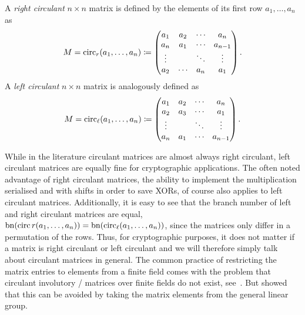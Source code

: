 \begin{definition}
    A \emph{right circulant} $n \times n$ matrix is defined by the elements of its first row $a_1, \ldots, a_n$ as
    \begin{equation*}
        M = \operatorname{circ}_r(a_1, \ldots, a_n) \coloneqq \begin{pmatrix}
            a_1    & a_2    & \cdots & a_n     \\
            a_n    & a_1    & \cdots & a_{n-1} \\
            \vdots &        & \ddots & \vdots  \\
            a_2    & \cdots & a_n    & a_1     \\
        \end{pmatrix}.
    \end{equation*}
    A \emph{left circulant} $n \times n$ matrix is analogously defined as
    \begin{equation*}
        M = \operatorname{circ}_{\ell}(a_1, \ldots, a_n) \coloneqq \begin{pmatrix}
            a_1    & a_2    & \cdots & a_n     \\
            a_2    & a_3    & \cdots & a_1     \\
            \vdots &        & \ddots & \vdots  \\
            a_n    & a_1    & \cdots & a_{n-1} \\
        \end{pmatrix}.
    \end{equation*}
\end{definition}


While in the literature circulant matrices are almost always right circulant, left circulant matrices are equally fine for cryptographic applications.
The often noted advantage of right circulant matrices, the ability to implement the multiplication serialised and with shifts in order to save XORs, of course also applies to left circulant matrices.
Additionally, it is easy to see that the branch number of left and right circulant matrices are equal, $\mathrm{bn}(\operatorname{circ}{r}(a_1, \ldots, a_n)) = \mathrm{bn}(\operatorname{circ}_{\ell}(a_1, \ldots, a_n))$, since the matrices only differ in a permutation of the rows. Thus, for cryptographic purposes, it does not matter if a matrix is right circulant or left circulant and we will therefore simply talk about circulant matrices in general.
The common practice of restricting the matrix entries to elements from a finite field comes with the problem that circulant involutory \MDS/ matrices over finite fields do not exist, see~\cite{IJNSEC:NakAbr09}.
But \textcite{FSE:LiWan16} showed that this can be avoided by taking the matrix elements from the general linear group.

